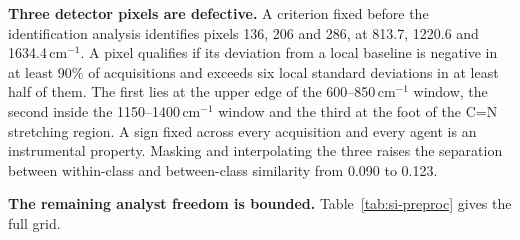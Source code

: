 \documentclass[11pt]{article}
\newcommand*\wn{\ensuremath{\text{cm}^{-1}}}
\begin{document}
\textbf{Three detector pixels are defective.} A criterion fixed before the identification
analysis identifies pixels 136, 206 and 286, at 813.7, 1220.6 and 1634.4\,\wn{}. A
pixel qualifies if its deviation from a local baseline is negative in at least 90\% of
acquisitions and exceeds six local standard deviations in at least half of them. The first lies at
the upper edge of the 600--850\,\wn{} window, the second inside the 1150--1400\,\wn{}
window and the third at the foot of the C=N stretching region. A sign fixed across every
acquisition and every agent is an instrumental property. Masking and interpolating the
three raises the separation between within-class and between-class similarity from 0.090 to 0.123.

\textbf{The remaining analyst freedom is bounded.} Table~\ref{tab:si-preproc} gives the
full grid.
\end{document}
